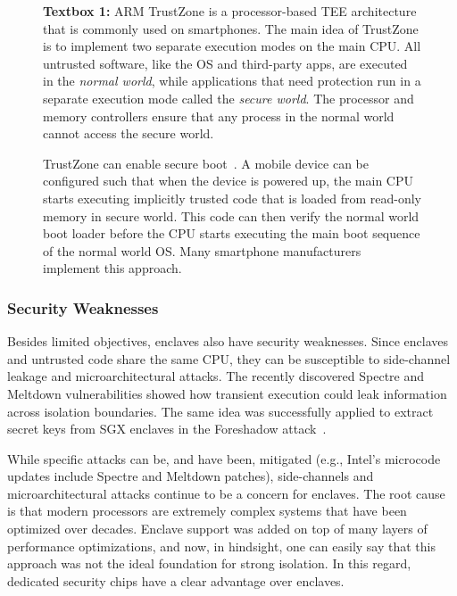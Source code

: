 \begin{figure}
    \begin{tcolorbox}
    \textbf{Textbox 1:} 
    ARM TrustZone is a processor-based TEE architecture that is commonly used on smartphones. The main idea of TrustZone is to implement two separate execution modes on the main CPU. All untrusted software, like the OS and third-party apps, are executed in the \emph{normal world}, while applications that need protection run in a separate execution mode called the \emph{secure world}. The processor and memory controllers ensure that any process in the normal world cannot access the secure world.
    
    \hspace{10pt} TrustZone can enable secure boot~\cite{ekberg2014untapped}. A mobile device can be configured such that when the device is powered up, the main CPU starts executing implicitly trusted code that is loaded from read-only memory in secure world. This code can then verify the normal world boot loader before the CPU starts executing the main boot sequence of the normal world OS. Many smartphone manufacturers implement this approach.
	\end{tcolorbox}
\end{figure}  


\subsubsection*{Security Weaknesses}

Besides limited objectives, enclaves also have security weaknesses. Since enclaves and untrusted code share the same CPU, they can be susceptible to side-channel leakage and microarchitectural attacks. The recently discovered Spectre and Meltdown vulnerabilities showed how transient execution could leak information across isolation boundaries. The same idea was successfully applied to extract secret keys from SGX enclaves in the Foreshadow attack~\cite{van2018foreshadow}. 

While specific attacks can be, and have been, mitigated (e.g., Intel's microcode updates include Spectre and Meltdown patches), side-channels and microarchitectural attacks continue to be a concern for enclaves. The root cause is that modern processors are extremely complex systems that have been optimized over decades. Enclave support was added on top of many layers of performance optimizations, and now, in hindsight, one can easily say that this approach was not the ideal foundation for strong isolation. In this regard, dedicated security chips have a clear advantage over enclaves.

